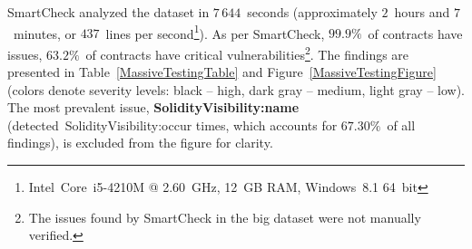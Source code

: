 SmartCheck analyzed the dataset in $7\,644$~seconds (approximately $2$~hours and $7$~minutes, or $437$~lines per second\footnote{Intel~Core~i5-4210M @ 2.60~GHz, 12~GB RAM, Windows~8.1 64~bit}).
As per SmartCheck, $99.9\%$~of contracts have issues, $63.2\%$~of contracts have critical vulnerabilities\footnote{The issues found by SmartCheck in the big dataset were not manually verified.}.
The findings are presented in Table~\ref{MassiveTestingTable} and Figure~\ref{MassiveTestingFigure} (colors denote severity levels: black -- high, dark gray -- medium, light gray -- low).
The most prevalent issue, \textbf{\let\letcs\texapiletcs \usevalue SolidityVisibility:name \let\letcs\etoolboxletcs} (detected~{\let\letcs\texapiletcs \usevalue SolidityVisibility:occur \let\letcs\etoolboxletcs} times, which accounts for $67.30\%$~of all findings), is excluded from the figure for clarity.

